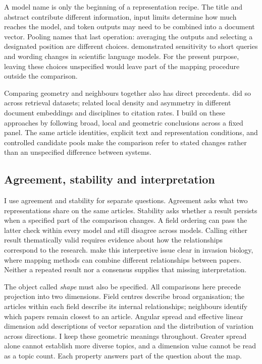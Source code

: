 \documentclass[12pt]{article}
\begin{document}
A model name is only the beginning of a representation recipe. The title and abstract contribute different information, input limits determine how much reaches the model, and token outputs may need to be combined into a document vector. Pooling names that last operation: averaging the outputs and selecting a designated position are different choices. \citet{singh-singh-2022-inefficiency} demonstrated sensitivity to short queries and wording changes in scientific language models. For the present purpose, leaving these choices unspecified would leave part of the mapping procedure outside the comparison.

Comparing geometry and neighbours together also has direct precedents. \citet{ref4e1e0d5582} did so across retrieval datasets; \citet{ref6da178065c} related local density and asymmetry in different document embeddings and disciplines to citation rates. I build on these approaches by following broad, local and geometric conclusions across a fixed panel. The same article identities, explicit text and representation conditions, and controlled candidate pools make the comparison refer to stated changes rather than an unspecified difference between systems.

\subsection{Agreement, stability and interpretation}
I use agreement and stability for separate questions. Agreement asks what two representations share on the same articles. Stability asks whether a result persists when a specified part of the comparison changes. A field ordering can pass the latter check within every model and still disagree across models. Calling either result thematically valid requires evidence about how the relationships correspond to the research. \citet{QSSreviewQ17} make this interpretive issue clear in invasion biology, where mapping methods can combine different relationships between papers. Neither a repeated result nor a consensus supplies that missing interpretation.

The object called \emph{shape} must also be specified. All comparisons here precede projection into two dimensions. Field centres describe broad organisation; the articles within each field describe its internal relationships; neighbours identify which papers remain closest to an article. Angular spread and effective linear dimension add descriptions of vector separation and the distribution of variation across directions. I keep these geometric meanings throughout. Greater spread alone cannot establish more diverse topics, and a dimension value cannot be read as a topic count. Each property answers part of the question about the map.
\end{document}
